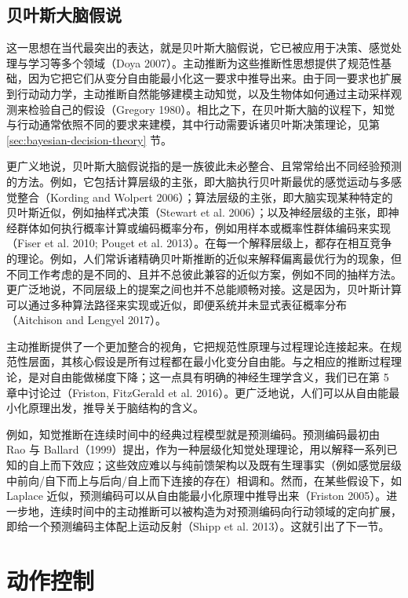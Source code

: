 \subsection{贝叶斯大脑假说}

这一思想在当代最突出的表达，就是贝叶斯大脑假说，它已被应用于决策、感觉处理与学习等多个领域（Doya 2007）。主动推断为这些推断性思想提供了规范性基础，因为它把它们从变分自由能最小化这一要求中推导出来。由于同一要求也扩展到行动动力学，主动推断自然能够建模主动知觉，以及生物体如何通过主动采样观测来检验自己的假设（Gregory 1980）。相比之下，在贝叶斯大脑的议程下，知觉与行动通常依照不同的要求来建模，其中行动需要诉诸贝叶斯决策理论，见第 \ref{sec:bayesian-decision-theory} 节。

更广义地说，贝叶斯大脑假说指的是一族彼此未必整合、且常常给出不同经验预测的方法。例如，它包括计算层级的主张，即大脑执行贝叶斯最优的感觉运动与多感觉整合（Kording and Wolpert 2006）；算法层级的主张，即大脑实现某种特定的贝叶斯近似，例如抽样式决策（Stewart et al. 2006）；以及神经层级的主张，即神经群体如何执行概率计算或编码概率分布，例如用样本或概率性群体编码来实现（Fiser et al. 2010; Pouget et al. 2013）。在每一个解释层级上，都存在相互竞争的理论。例如，人们常诉诸精确贝叶斯推断的近似来解释偏离最优行为的现象，但不同工作考虑的是不同的、且并不总彼此兼容的近似方案，例如不同的抽样方法。更广泛地说，不同层级上的提案之间也并不总能顺畅对接。这是因为，贝叶斯计算可以通过多种算法路径来实现或近似，即便系统并未显式表征概率分布（Aitchison and Lengyel 2017）。

主动推断提供了一个更加整合的视角，它把规范性原理与过程理论连接起来。在规范性层面，其核心假设是所有过程都在最小化变分自由能。与之相应的推断过程理论，是对自由能做梯度下降；这一点具有明确的神经生理学含义，我们已在第 5 章中讨论过（Friston, FitzGerald et al. 2016）。更广泛地说，人们可以从自由能最小化原理出发，推导关于脑结构的含义。

例如，知觉推断在连续时间中的经典过程模型就是预测编码。预测编码最初由 Rao 与 Ballard（1999）提出，作为一种层级化知觉处理理论，用以解释一系列已知的自上而下效应；这些效应难以与纯前馈架构以及既有生理事实（例如感觉层级中前向/自下而上与后向/自上而下连接的存在）相调和。然而，在某些假设下，如 Laplace 近似，预测编码可以从自由能最小化原理中推导出来（Friston 2005）。进一步地，连续时间中的主动推断可以被构造为对预测编码向行动领域的定向扩展，即给一个预测编码主体配上运动反射（Shipp et al. 2013）。这就引出了下一节。

\section{动作控制}


